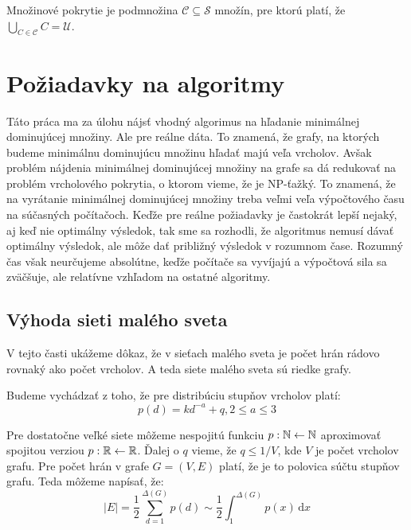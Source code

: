 Množinové pokrytie je podmnožina $\mathcal{C} \subseteq \mathcal{S}$ množín, 
pre ktorú platí, že $\bigcup_{C \in \mathcal{C}} C = \mathcal{U}$.

\section{Požiadavky na algoritmy}

Táto práca ma za úlohu nájsť vhodný algorimus na hľadanie minimálnej 
dominujúcej množiny. Ale pre reálne dáta. To znamená, že grafy, na ktorých 
budeme minimálnu dominujúcu množinu hľadať majú veľa vrcholov. Avšak problém 
nájdenia minimálnej dominujúcej množiny na grafe sa dá redukovať na problém 
vrcholového pokrytia, o ktorom vieme, že je NP-ťažký. To znamená, že na 
vyrátanie minimálnej dominujúcej množiny treba veľmi veľa výpočtového času na 
súčasných počítačoch. Keďže pre reálne požiadavky je častokrát lepší nejaký, 
aj keď nie optimálny výsledok, tak sme sa rozhodli, že algoritmus nemusí dávať 
optimálny výsledok, ale môže dať približný výsledok v rozumnom čase. Rozumný 
čas však neurčujeme absolútne, keďže počítače sa vyvíjajú a výpočtová sila sa 
zväčšuje, ale relatívne vzhľadom na ostatné algoritmy.

\subsection{Výhoda sieti malého sveta}

V tejto časti ukážeme dôkaz, že v sieťach malého sveta je počet hrán rádovo 
rovnaký ako počet vrcholov. A teda siete malého sveta sú riedke grafy. 

Budeme vychádzať z toho, že pre distribúciu stupňov vrcholov platí:
$$p(d) = kd^{-a} + q, 2 \leq a \leq 3$$

Pre dostatočne veľké siete môžeme nespojitú funkciu $p : \mathbb{N} \leftarrow \mathbb{N}$ 
aproximovať spojitou verziou $p : \mathbb{R} \leftarrow \mathbb{R}$. Ďalej o $q$ vieme, že 
$q \leq 1/V$, kde $V$ je počet vrcholov grafu. Pre počet hrán v grafe 
$G = (V, E)$ platí, že je to polovica súčtu stupňov grafu. Teda môžeme napísať, 
že: $$|E| = \frac{1}{2}\sum_{d = 1}^{\Delta(G)} p(d) \sim 
\frac{1}{2}\int_1^{\Delta (G)} \! p(x) \, \mathrm{d}x$$


